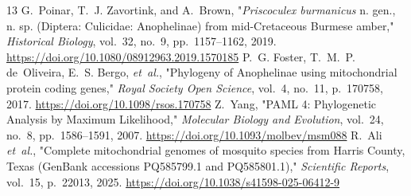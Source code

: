 \documentclass[10pt,letterpaper]{article}
\begin{document}
\begin{thebibliography}{13}
 G.~Poinar, T.~J. Zavortink, and A.~Brown, "\emph{Priscoculex burmanicus} n. gen., n. sp. (Diptera: Culicidae: Anophelinae) from mid-Cretaceous Burmese amber," \emph{Historical Biology}, vol.~32, no.~9, pp.~1157--1162, 2019. \url{https://doi.org/10.1080/08912963.2019.1570185}
 P.~G. Foster, T.~M.~P. de~Oliveira, E.~S. Bergo, \emph{et~al.}, "Phylogeny of Anophelinae using mitochondrial protein coding genes," \emph{Royal Society Open Science}, vol.~4, no.~11, p.~170758, 2017. \url{https://doi.org/10.1098/rsos.170758}
 Z.~Yang, "PAML 4: Phylogenetic Analysis by Maximum Likelihood," \emph{Molecular Biology and Evolution}, vol.~24, no.~8, pp.~1586--1591, 2007. \url{https://doi.org/10.1093/molbev/msm088}
 R.~Ali \emph{et~al.}, "Complete mitochondrial genomes of mosquito species from Harris County, Texas (GenBank accessions PQ585799.1 and PQ585801.1)," \emph{Scientific Reports}, vol.~15, p.~22013, 2025. \url{https://doi.org/10.1038/s41598-025-06412-9}
\end{thebibliography}
\end{document}
